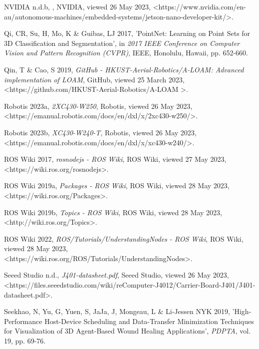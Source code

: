 NVIDIA n.d.b, \textit{}, NVIDIA, viewed 26 May 2023, \textless https://www.nvidia.com/en-au/autonomous-machines/embedded-systems/jetson-nano-developer-kit/\textgreater.

Qi, CR, Su, H, Mo, K \& Guibas, LJ 2017, 'PointNet: Learning on Point Sets for 3D Classification and Segmentation', in \textit{2017 IEEE Conference on Computer Vision and Pattern Recognition (CVPR)}, IEEE, Honolulu, Hawaii, pp. 652-660.

Qin, T \& Cao, S 2019, \textit{GitHub - HKUST-Aerial-Robotics/A-LOAM: Advanced implementation of LOAM}, GitHub, viewed 25 March 2023, \textless https://github.com/HKUST-Aerial-Robotics/A-LOAM \textgreater.

Robotis 2023a, \textit{2XC430-W250}, Robotis, viewed 26 May 2023, \\ \textless https://emanual.robotis.com/docs/en/dxl/x/2xc430-w250/\textgreater.

Robotis 2023b, \textit{XC430-W240-T}, Robotis, viewed 26 May 2023, \\ \textless https://emanual.robotis.com/docs/en/dxl/x/xc430-w240/\textgreater.

ROS Wiki 2017, \textit{rosnodejs - ROS Wiki}, ROS Wiki, viewed 27 May 2023, \\ \textless https://wiki.ros.org/rosnodejs\textgreater.

ROS Wiki 2019a, \textit{Packages - ROS Wiki}, ROS Wiki, viewed 28 May 2023, \\ \textless https://wiki.ros.org/Packages\textgreater.

ROS Wiki 2019b, \textit{Topics - ROS Wiki}, ROS Wiki, viewed 28 May 2023, \\ \textless http://wiki.ros.org/Topics\textgreater.

ROS Wiki 2022, \textit{ROS/Tutorials/UnderstandingNodes - ROS Wiki}, ROS Wiki, viewed 28 May 2023, \\ \textless https://wiki.ros.org/ROS/Tutorials/UnderstandingNodes\textgreater.

Seeed Studio n.d., \textit{J401-datasheet.pdf}, Seeed Studio, viewed 26 May 2023, \\ \textless https://files.seeedstudio.com/wiki/reComputer-J4012/Carrier-Board-J401/J401-datasheet.pdf\textgreater.

Seekhao, N, Yu, G, Yuen, S, JaJa, J, Mongeau, L \& Li-Jessen NYK 2019, 'High-Performance Host-Device Scheduling and Data-Transfer Minimization Techniques for Visualization of 3D Agent-Based Wound Healing Applications', \textit{PDPTA}, vol. 19, pp. 69-76.

